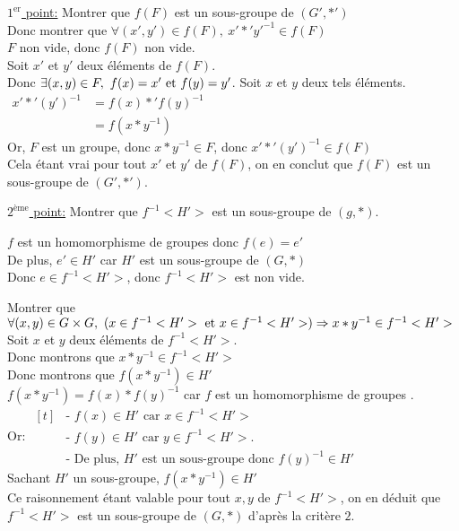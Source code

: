 \documentclass[12pt,twoside,a4paper]{article}
\begin{document}
			\begin{preuve}
				\begin{liste}
					\item \underline{$1^{\text{er}}$ point:} Montrer que $f(F)$ est un sous-groupe de $(G',*')$\\
						Donc montrer que $\forall(x',y')\in f(F),\ x'*'y'^{-1}\in f(F)$\\
						$F$ non vide, donc $f(F)$ non vide.\\
						Soit $x'$ et $y'$ deux \'el\'ements de $f(F)$.\\
						Donc $\exists (x,y)\in F,\ f(x)=x'\text{ et } f(y)=y'$. Soit $x$ et $y$ deux tels \'el\'ements.\\
						$\begin{aligned}x'*'(y')^{-1}&=f(x)*'f(y)^{-1}\\&=f(x*y^{-1})\end{aligned}$\\
						Or, $F$ est un groupe, donc $x*y^{-1}\in F$, donc $x'*'(y')^{-1}\in f(F)$\\
						Cela \'etant vrai pour tout $x'$ et $y'$ de $f(F)$, on en conclut que $f(F)$ est un sous-groupe de $(G',*')$.
					\item \underline{$2^{\text{\`eme}}$ point:} Montrer que $f^{-1}<H'>$ est un sous-groupe de $(g,*)$.\\
						\begin{liste}
							\item $f$ est un homomorphisme de groupes donc $f(e)=e'$\\
								De plus, $e'\in H'$ car $H'$ est un sous-groupe de $(G,*)$\\
								Donc $e\in f^{-1}<H'>$, donc $f^{-1}<H'>$ est non vide.
							\item Montrer que $\forall (x,y)\in G\times G,\ (x\in f^{-1}<H'>\et x\in f^{-1}<H'>)\Rightarrow x*y^{-1}\in f^{-1}<H'>$
								Soit $x$ et $y$ deux \'el\'ements de $f^{-1}<H'>$.\\
								Donc montrons que $x*y^{-1}\in f^{-1}<H'>$\\
								Donc montrons que $f(x*y^{-1})\in H'$\\
								$f(x*y^{-1})=f(x)*f(y)^{-1}$ car $f$ est un homomorphisme de groupes .\\
								Or: 
								$\begin{aligned}[t]
								&\text{- }f(x)\in H'\text{ car }x\in f^{-1}<H'>\\
								&\text{- }f(y)\in H'\text{ car }y\in f^{-1}<H'>\text{.}\\
								&\text{- De plus, }H'\text{ est un sous-groupe donc }f(y)^{-1}\in H'
								\end{aligned}$\\
								Sachant $H'$ un sous-groupe, $f(x*y^{-1})\in H'$\\
								Ce raisonnement \'etant valable pour tout $x,y$ de $f^{-1}<H'>$, on en d\'eduit que $f^{-1}<H'>$ est un sous-groupe de $(G,*)$ d'apr\`es la crit\`ere $2$.
						\end{liste} 
				\end{liste}
			\end{preuve}
\end{document}
